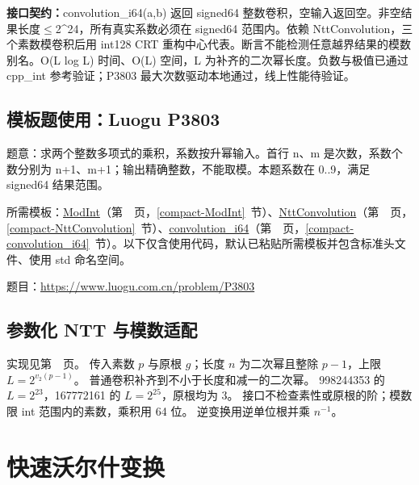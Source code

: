 {\sloppy{}\noindent\textbf{接口契约：}convolution\_i64(a,b) 返回 signed64 整数卷积，空输入返回空。非空结果长度$\le$2\textasciicircum{}24，所有真实系数必须在 signed64 范围内。依赖 NttConvolution，三个素数模卷积后用 int128 CRT 重构中心代表。断言不能检测任意越界结果的模数别名。O(L log L) 时间、O(L) 空间，L 为补齐的二次幂长度。负数与极值已通过 cpp\_int 参考验证；P3803 最大次数驱动本地通过，线上性能待验证。\par}



\Needspace{312pt}

\subsection*{模板题使用：Luogu P3803}

\label{usage-example-52}

题意：求两个整数多项式的乘积，系数按升幂输入。首行 n、m 是次数，系数个数分别为 n+1、m+1；输出精确整数，不能取模。本题系数在 0..9，满足 signed64 结果范围。

所需模板：\hyperref[compact-ModInt]{ModInt}（第~\pageref{compact-ModInt}~页，\ref{compact-ModInt}~节）、\hyperref[compact-NttConvolution]{NttConvolution}（第~\pageref{compact-NttConvolution}~页，\ref{compact-NttConvolution}~节）、\hyperref[compact-convolution_i64]{convolution\_\allowbreak{}i64}（第~\pageref{compact-convolution_i64}~页，\ref{compact-convolution_i64}~节）。以下仅含使用代码，默认已粘贴所需模板并包含标准头文件、使用 std 命名空间。

题目：\url{https://www.luogu.com.cn/problem/P3803}



\subsection{参数化 NTT 与模数适配}\label{knowledge-ntt-moduli}
实现见第~\pageref{compact-NttConvolution}~页。
传入素数 $p$ 与原根 $g$；长度 $n$ 为二次幂且整除 $p-1$，上限 $L=2^{v_2(p-1)}$。
普通卷积补齐到不小于长度和减一的二次幂。
998244353 的 $L=2^{23}$，167772161 的 $L=2^{25}$，原根均为 3。
接口不检查素性或原根的阶；模数限 int 范围内的素数，乘积用 64 位。
逆变换用逆单位根并乘 $n^{-1}$。

\clearpage


\Needspace{180pt}

\section{快速沃尔什变换}

